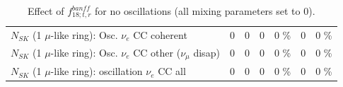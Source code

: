 \begin{table}
\begin{tabular}{| l | r | r | r  r | r  r |}
                          $N_{SK}$ (1 $\mu$-like ring): Osc. $\nu_e$ CC coherent &               0 &               0 &               0 &        0 \%  &               0 &        0 \%  \\ 
           $N_{SK}$ (1 $\mu$-like ring): Osc. $\nu_e$ CC other ($\nu_\mu$ disap) &               0 &               0 &               0 &        0 \%  &               0 &        0 \%  \\ 
                        $N_{SK}$ (1 $\mu$-like ring): oscillation $\nu_e$ CC all &               0 &               0 &               0 &        0 \%  &               0 &        0 \%  \\ 
\hline
\hline
\end{tabular}
\caption{ Effect of $f_{18; t, r}^{banff}$ for no oscillations (all mixing parameters set to 0). }
\label{tab:num_banff_ccqeE0_1RmuT_3f_osc_t13:0}
\end{table}
\clearpage
